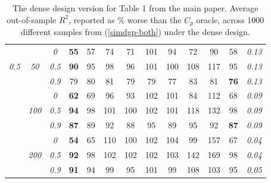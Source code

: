 \documentclass[12pt]{article}
\begin{document}
\begin{table}
\begin{center}
\begin{tabular}{ccc|cc|cc|cc|cc|c|c}
& & \it  0  & {\bf 55} & 57 & 74 & 71 & 101 & 94 & 72 & 90 & 58 & \it  0.13 \\
\it  0.5  & \it  50  & \it  0.5  & {\bf 90} & 95 & 98 & 96 & 101 & 100 & 108 & 117 & 95 & \it  0.13 \\
& & \it  0.9  & 79 & 80 & 81 & 79 & 79 & 77 & 83 & 81 & {\bf 76} & \it  0.13 \\[1ex]
\cline{2-3}\rule{0pt}{3ex}
& & \it  0  & {\bf 62} & 69 & 96 & 93 & 102 & 101 & 84 & 112 & 68 & \it  0.09 \\
 & \it  100  & \it  0.5  & {\bf 94} & 98 & 101 & 100 & 102 & 101 & 118 & 132 & 98 & \it  0.09 \\
& & \it  0.9  & {\bf 87} & 89 & 92 & 88 & 95 & 89 & 95 & 92 & {\bf 87} & \it  0.09 \\[1ex]
\cline{2-3}\rule{0pt}{3ex}
& & \it  0  & {\bf 54} & 65 & 110 & 100 & 102 & 104 & 99 & 157 & 67 & \it  0.04 \\
 & \it  200  & \it  0.5  & {\bf 92} & 98 & 102 & 102 & 102 & 103 & 142 & 169 & 98 & \it  0.04 \\
& & \it  0.9  & {\bf 91} & 94 & 99 & 95 & 101 & 99 & 108 & 103 & 95 & \it  0.05 \\[1ex]
\hline
\end{tabular}
\end{center}
\caption{\label{tab:simdense} The dense design version for Table 1 from the main paper.  Average out-of-sample $R^2$, reported as  \% worse than the $C_p$ oracle, across 1000 different samples from (\ref{simdgp-both}) under the dense design. }  
\end{table}


\end{document}
